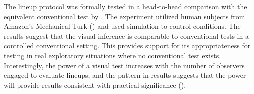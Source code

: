 \documentclass[12]{article}
\begin{document}
The lineup protocol was formally tested in a head-to-head comparison with the equivalent conventional test by \cite{majumder:2011}. The experiment utilized human subjects from Amazon's Mechanical Turk (\cite{turk}) and used simulation to control conditions. The results suggest that the visual inference is comparable to conventional tests in a controlled conventional setting. This provides support for its appropriateness for testing in real exploratory situations where no conventional test exists. Interestingly, the power of a visual test increases with the number of observers engaged to evaluate lineups, and the pattern in results suggests that the power will provide results consistent with practical significance (\cite{kirk:1996}).


%
\end{document}
